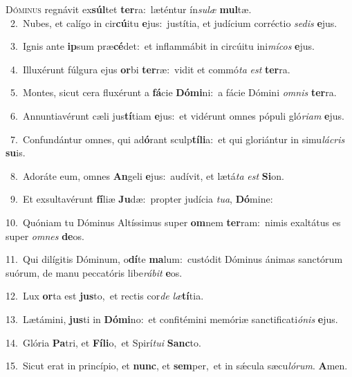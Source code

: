 \lettrine{\initial\textcolor{\initialcolor}{D}}{óminus} regnávit ex\-\textbf{súl}\-tet \textbf{ter}\-ra:~\star læténtur ín\-\textit{su}\-\textit{læ} \textbf{mul}\-tæ.\\
{\numbfont\textcolor{\numbcolor}{~2.}}~Nubes, et calígo in cir\-\textbf{cú}\-itu \textbf{e}\-jus:~\star justítia, et judícium corréctio \textit{se}\-\textit{dis} \textbf{e}\-jus.\par
{\numbfont\textcolor{\numbcolor}{~3.}}~Ignis ante \textbf{ip}\-sum præ\-\textbf{cé}\-det:~\star et inflammábit in circúitu ini\-\textit{mí}\-\textit{cos} \textbf{e}\-jus.\par
{\numbfont\textcolor{\numbcolor}{~4.}}~Illuxérunt fúlgura ejus \textbf{or}\-bi \textbf{ter}\-ræ:~\star vidit et commó\textit{ta} \textit{est} \textbf{ter}\-ra.\par
{\numbfont\textcolor{\numbcolor}{~5.}}~Montes, sicut cera fluxérunt a \textbf{fá}\-cie \textbf{Dó}\-\textbf{mi}ni:~\star a fácie Dómini \textit{om}\-\textit{nis} \textbf{ter}\-ra.\par
{\numbfont\textcolor{\numbcolor}{~6.}}~Annuntiavérunt cæli jus\-\textbf{tí}\-tiam \textbf{e}\-jus:~\star et vidérunt omnes pópuli gló\-\textit{ri}\-\textit{am} \textbf{e}\-jus.\par
{\numbfont\textcolor{\numbcolor}{~7.}}~Confundántur omnes, qui ad\-\textbf{ó}\-rant sculp\-\textbf{tí}\-\textbf{li}a:~\star et qui gloriántur in simu\-\textit{lá}\-\textit{cris} \textbf{su}\-is.\par
{\numbfont\textcolor{\numbcolor}{~8.}}~Adoráte eum, omnes \textbf{An}\-geli \textbf{e}\-jus:~\star audívit, et lætá\textit{ta} \textit{est} \textbf{Si}\-on.\par
{\numbfont\textcolor{\numbcolor}{~9.}}~Et exsultavérunt \textbf{fí}\-liæ \textbf{Ju}\-dæ:~\star propter judícia \textit{tu}\-\textit{a}, \textbf{Dó}\-mine:\par
{\numbfont\textcolor{\numbcolor}{10.}}~Quóniam tu Dóminus Altíssimus super \textbf{om}\-nem \textbf{ter}\-ram:~\star nimis exaltátus es super \textit{om}\-\textit{nes} \textbf{de}\-os.\par
{\numbfont\textcolor{\numbcolor}{11.}}~Qui dilígitis Dóminum, o\-\textbf{dí}\-te \textbf{ma}\-lum:~\star custódit Dóminus ánimas sanctórum suórum, de manu peccatóris libe\-\textit{rá}\-\textit{bit} \textbf{e}\-os.\par
{\numbfont\textcolor{\numbcolor}{12.}}~Lux \textbf{or}\-ta est \textbf{jus}\-to,~\star et rectis cor\textit{de} \textit{læ}\-\textbf{tí}tia.\par
{\numbfont\textcolor{\numbcolor}{13.}}~Lætámini, \textbf{jus}\-ti in \textbf{Dó}\-\textbf{mi}no:~\star et confitémini memóriæ sanctificati\-\textit{ó}\-\textit{nis} \textbf{e}\-jus.\par
{\numbfont\textcolor{\numbcolor}{14.}}~Glória \textbf{Pa}\-tri, et \textbf{Fí}\-\textbf{li}o,~\star et Spirí\-\textit{tu}\-\textit{i} \textbf{Sanc}\-to.\par
{\numbfont\textcolor{\numbcolor}{15.}}~Sicut erat in princípio, et \textbf{nunc}\-, et \textbf{sem}\-per,~\star et in sǽcula sæcu\-\textit{ló}\-\textit{rum}. \textbf{A}\-men.\par
